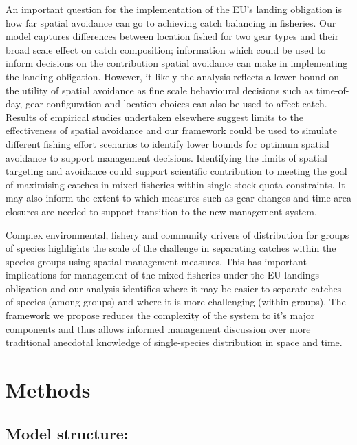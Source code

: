 \documentclass{nature}
\begin{document}
\begin{linenumbers}
An important question for the implementation of the EU's landing obligation is
how far spatial avoidance can go to achieving catch balancing in fisheries.
Our model captures differences between location fished for two gear types and
their broad scale effect on catch composition; information which could be used
to inform decisions on the contribution spatial avoidance can make in
implementing the landing obligation. However, it likely the analysis reflects a
lower bound on the utility of spatial avoidance as fine scale behavioural
decisions such as time-of-day, gear configuration and location choices can also
be used to affect catch\cite{Abbott2015, Thorson2016}. Results of empirical
studies undertaken elsewhere\cite{Branch2008, Kuriyama2016} suggest limits to
the effectiveness of spatial avoidance and our framework could be used to
simulate different fishing effort scenarios to identify lower bounds for
optimum spatial avoidance\cite{Reimer2017} to support management
decisions\cite{Ulrich2016}. Identifying the limits of spatial targeting and
avoidance could support scientific contribution to meeting the goal of
maximising catches in mixed fisheries within single stock quota constraints.
It may also inform the extent to which measures such as  gear changes and
time-area closures are needed to support transition to the new management
system.

Complex environmental, fishery and community drivers of distribution for groups
of species highlights the scale of the challenge in separating catches within
the species-groups using spatial management measures. This has important
implications for management of the mixed fisheries under the EU landings
obligation and our analysis identifies where it may be easier to separate
catches of species (among groups) and where it is more challenging (within
groups). The framework we propose reduces the complexity of the system to it's
major components and thus allows informed management discussion over more
traditional anecdotal knowledge of single-species distribution in space and
time.


\section*{Methods}

\subsection{Model structure:} 


\end{linenumbers}
\end{document}
